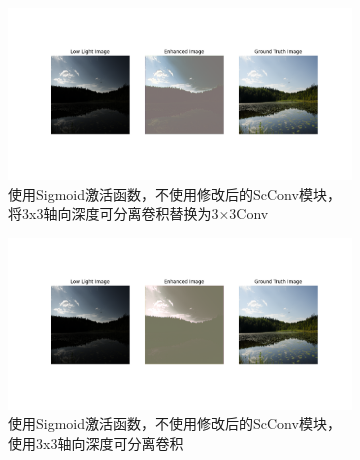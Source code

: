 \documentclass[a4paper]{ctexart}
\begin{document}
		\begin{figure}[htb]
			\centering
			\begin{subfigure}{\textwidth}
				\centering
				\includegraphics[width=0.6\linewidth]{picture/LLIE/Experiment/myplot_sigmoid_stem3x3_without_ScConv_Axial}
				\captionsetup{font=scriptsize}
				\caption{使用Sigmoid激活函数，不使用修改后的ScConv模块，将3x3轴向深度可分离卷积替换为3$\times$3Conv}
				\label{fig: myplot_sigmoid_stem3x3_without_ScConv_Axial}
			\end{subfigure}
			\begin{subfigure}{\textwidth}
				\centering
				\includegraphics[width=0.6\linewidth]{picture/LLIE/Experiment/myplot_Sigmoid_without_ScConv_conv3x3}
				\captionsetup{font=scriptsize}
				\caption{使用Sigmoid激活函数，不使用修改后的ScConv模块，使用3x3轴向深度可分离卷积}
				\label{fig: myplot_Sigmoid_without_ScConv_conv3x3}	
			\end{subfigure}
			\caption{
				\label{fig: Axial}
			}
		\end{figure}
		
		\renewcommand{\refname}{References}
		
		
			
			
			
			
			
			
		
		
		
		
		
	
\end{document}

